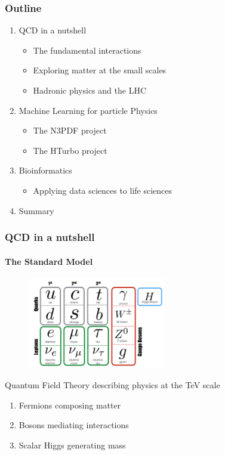 \documentclass[aspectratio=43]{beamer}
\begin{document}
\begin{frame}

	\frametitle{Outline}
	
	\begin{enumerate}
		\item {\color{blue}QCD in a nutshell}
		\begin{itemize}
			\item The fundamental interactions
			\item Exploring matter at the small scales
			\item Hadronic physics and the LHC
		\end{itemize}
		\item {\color{blue}Machine Learning for particle Physics}
		\begin{itemize}	
			\item The N3PDF project
			\item The HTurbo project
		\end{itemize}	
		\item {\color{blue}Bioinformatics}
		\begin{itemize}
			\item Applying data sciences to life sciences
		\end{itemize}
		\item {\color{blue}Summary}
	\end{enumerate}
	
\end{frame}

\begin{frame}


\end{frame}

\begin{frame}
	
	\frametitle{QCD in a nutshell}
	\framesubtitle{The Standard Model}
	
	\begin{figure}
		\includegraphics[width =6cm]{plots/section1/SM.png}
	\end{figure}
	
	
	Quantum Field Theory describing physics at the TeV scale
	\begin{enumerate}
		\item Fermions composing matter
		\item Bosons mediating interactions
		\item Scalar Higgs generating mass
	\end{enumerate}	

\end{frame}
\end{document}
